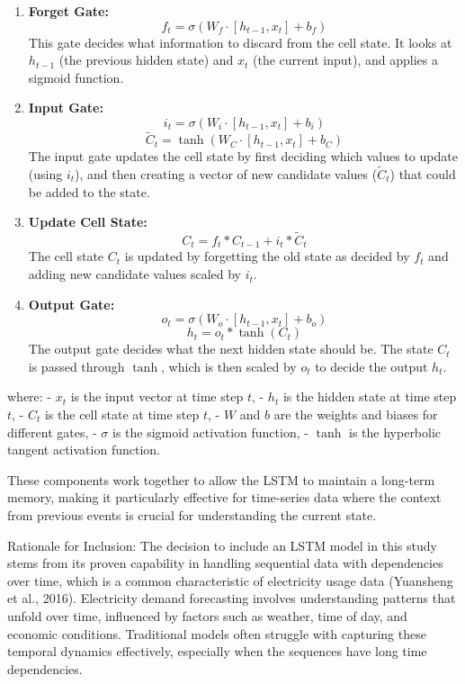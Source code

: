 \documentclass[
]{article}
\begin{document}
\begin{enumerate}
\def\labelenumi{\arabic{enumi}.}
\item
  \textbf{Forget Gate:}
  \[ f_t = \sigma(W_f \cdot [h_{t-1}, x_t] + b_f) \] This gate decides
  what information to discard from the cell state. It looks at
  \(h_{t-1}\) (the previous hidden state) and \(x_t\) (the current
  input), and applies a sigmoid function.
\item
  \textbf{Input Gate:}
  \[ i_t = \sigma(W_i \cdot [h_{t-1}, x_t] + b_i) \]
  \[ \tilde{C}_t = \tanh(W_C \cdot [h_{t-1}, x_t] + b_C) \] The input
  gate updates the cell state by first deciding which values to update
  (using \(i_t\)), and then creating a vector of new candidate values
  (\(\tilde{C}_t\)) that could be added to the state.
\item
  \textbf{Update Cell State:}
  \[ C_t = f_t * C_{t-1} + i_t * \tilde{C}_t \] The cell state \(C_t\)
  is updated by forgetting the old state as decided by \(f_t\) and
  adding new candidate values scaled by \(i_t\).
\item
  \textbf{Output Gate:}
  \[ o_t = \sigma(W_o \cdot [h_{t-1}, x_t] + b_o) \]
  \[ h_t = o_t * \tanh(C_t) \] The output gate decides what the next
  hidden state should be. The state \(C_t\) is passed through \(\tanh\),
  which is then scaled by \(o_t\) to decide the output \(h_t\).
\end{enumerate}

where: - \(x_t\) is the input vector at time step \(t\), - \(h_t\) is
the hidden state at time step \(t\), - \(C_t\) is the cell state at time
step \(t\), - \(W\) and \(b\) are the weights and biases for different
gates, - \(\sigma\) is the sigmoid activation function, - \(\tanh\) is
the hyperbolic tangent activation function.

These components work together to allow the LSTM to maintain a long-term
memory, making it particularly effective for time-series data where the
context from previous events is crucial for understanding the current
state.

Rationale for Inclusion: The decision to include an LSTM model in this
study stems from its proven capability in handling sequential data with
dependencies over time, which is a common characteristic of electricity
usage data (Yuansheng et al., 2016). Electricity demand forecasting
involves understanding patterns that unfold over time, influenced by
factors such as weather, time of day, and economic conditions.
Traditional models often struggle with capturing these temporal dynamics
effectively, especially when the sequences have long time dependencies.
\end{document}
